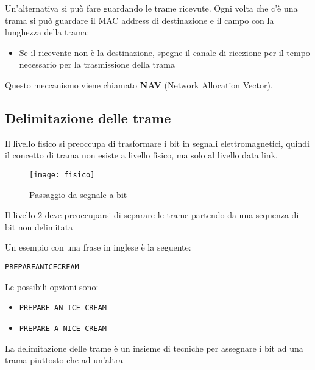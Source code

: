 \documentclass[a4paper]{article}
\begin{document}
\vspace{1em}
\noindent
Un'alternativa si può fare guardando le trame ricevute. Ogni volta che c'è una trama si
può guardare il MAC address di destinazione e il campo con la lunghezza della trama:
\begin{itemize}
  \item Se il ricevente non è la destinazione, spegne il canale di ricezione per
    il tempo necessario per la trasmissione della trama
\end{itemize}
Questo meccanismo viene chiamato \textbf{NAV} (Network Allocation Vector).

\subsection{Delimitazione delle trame}
Il livello fisico si preoccupa di trasformare i bit in segnali elettromagnetici,
quindi il concetto di trama non esiste a livello fisico, ma solo al livello data link.
\begin{figure}[H]
  \centering
  \texttt{[image: fisico]}
  \caption{Passaggio da segnale a bit}
\end{figure}
\noindent
Il livello 2 deve preoccuparsi di separare le trame partendo da una sequenza di bit
non delimitata
\begin{example}
  Un esempio con una frase in inglese è la seguente:
  \begin{center}
    \texttt{PREPAREANICECREAM}
  \end{center}
  Le possibili opzioni sono:
  \begin{itemize}
    \item \texttt{PREPARE AN ICE CREAM}
    \item \texttt{PREPARE A NICE CREAM}
  \end{itemize}
\end{example}

\vspace{1em}
\noindent
La delimitazione delle trame è un insieme di tecniche per assegnare i bit ad una
trama piuttosto che ad un'altra
\end{document}
